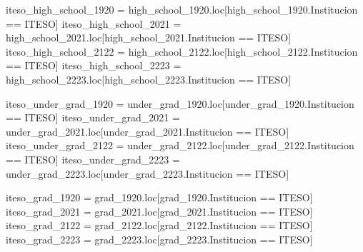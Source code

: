 \documentclass[
  letterpaper,
  DIV=11,
  numbers=noendperiod]{scrartcl}
\newenvironment{Shaded}{\begin{snugshade}}{\end{snugshade}}
\newcommand{\NormalTok}[1]{\textcolor[rgb]{0.00,0.23,0.31}{#1}}
\newcommand{\OperatorTok}[1]{\textcolor[rgb]{0.37,0.37,0.37}{#1}}
\newcommand{\StringTok}[1]{\textcolor[rgb]{0.13,0.47,0.30}{#1}}
\begin{document}
\begin{Shaded}
\begin{Highlighting}[]
\NormalTok{iteso\_high\_school\_1920 }\OperatorTok{=}\NormalTok{ high\_school\_1920.loc[high\_school\_1920.Institucion }\OperatorTok{==} \StringTok{\textquotesingle{}ITESO\textquotesingle{}}\NormalTok{]}
\NormalTok{iteso\_high\_school\_2021 }\OperatorTok{=}\NormalTok{ high\_school\_2021.loc[high\_school\_2021.Institucion }\OperatorTok{==} \StringTok{\textquotesingle{}ITESO\textquotesingle{}}\NormalTok{]}
\NormalTok{iteso\_high\_school\_2122 }\OperatorTok{=}\NormalTok{ high\_school\_2122.loc[high\_school\_2122.Institucion }\OperatorTok{==} \StringTok{\textquotesingle{}ITESO\textquotesingle{}}\NormalTok{]}
\NormalTok{iteso\_high\_school\_2223 }\OperatorTok{=}\NormalTok{ high\_school\_2223.loc[high\_school\_2223.Institucion }\OperatorTok{==} \StringTok{\textquotesingle{}ITESO\textquotesingle{}}\NormalTok{]}

\NormalTok{iteso\_under\_grad\_1920 }\OperatorTok{=}\NormalTok{ under\_grad\_1920.loc[under\_grad\_1920.Institucion }\OperatorTok{==} \StringTok{\textquotesingle{}ITESO\textquotesingle{}}\NormalTok{]}
\NormalTok{iteso\_under\_grad\_2021 }\OperatorTok{=}\NormalTok{ under\_grad\_2021.loc[under\_grad\_2021.Institucion }\OperatorTok{==} \StringTok{\textquotesingle{}ITESO\textquotesingle{}}\NormalTok{]}
\NormalTok{iteso\_under\_grad\_2122 }\OperatorTok{=}\NormalTok{ under\_grad\_2122.loc[under\_grad\_2122.Institucion }\OperatorTok{==} \StringTok{\textquotesingle{}ITESO\textquotesingle{}}\NormalTok{]}
\NormalTok{iteso\_under\_grad\_2223 }\OperatorTok{=}\NormalTok{ under\_grad\_2223.loc[under\_grad\_2223.Institucion }\OperatorTok{==} \StringTok{\textquotesingle{}ITESO\textquotesingle{}}\NormalTok{]}

\NormalTok{iteso\_grad\_1920 }\OperatorTok{=}\NormalTok{ grad\_1920.loc[grad\_1920.Institucion }\OperatorTok{==} \StringTok{\textquotesingle{}ITESO\textquotesingle{}}\NormalTok{]}
\NormalTok{iteso\_grad\_2021 }\OperatorTok{=}\NormalTok{ grad\_2021.loc[grad\_2021.Institucion }\OperatorTok{==} \StringTok{\textquotesingle{}ITESO\textquotesingle{}}\NormalTok{]}
\NormalTok{iteso\_grad\_2122 }\OperatorTok{=}\NormalTok{ grad\_2122.loc[grad\_2122.Institucion }\OperatorTok{==} \StringTok{\textquotesingle{}ITESO\textquotesingle{}}\NormalTok{]}
\NormalTok{iteso\_grad\_2223 }\OperatorTok{=}\NormalTok{ grad\_2223.loc[grad\_2223.Institucion }\OperatorTok{==} \StringTok{\textquotesingle{}ITESO\textquotesingle{}}\NormalTok{]}
\end{Highlighting}
\end{Shaded}
\end{document}
